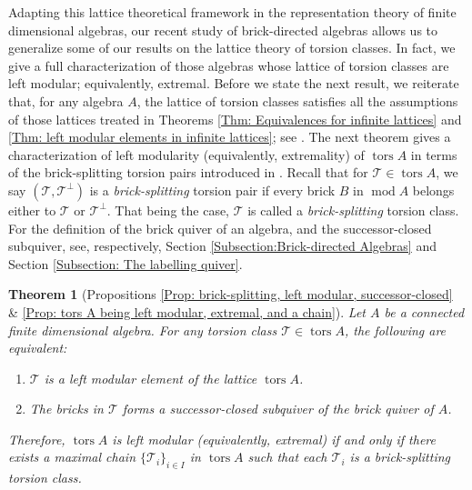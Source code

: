 \documentclass{amsart}
\theoremstyle{thmstyle}
\newtheorem{theorem}[thm]{Theorem}
\theoremstyle{exstyle}
\theoremstyle{defstyle}
\theoremstyle{remstyle}
\theoremstyle{remstyle}
\DeclareMathOperator*{\modu}{mod}
\DeclareMathOperator*{\brick}{brick}
\DeclareMathOperator*{\tors}{tors}
\DeclareMathOperator*{\Hasse}{Hasse}
\begin{document}
Adapting this lattice theoretical framework in the representation theory of finite dimensional algebras, our recent study of brick-directed algebras \cite{AI+} allows us to generalize some of our results on the lattice theory of torsion classes. In fact, we give a full characterization of those algebras whose lattice of torsion classes are left modular; equivalently, extremal. 
Before we state the next result, we reiterate that, for any algebra $A$, the lattice of torsion classes satisfies all the assumptions of those lattices treated in Theorems \ref{Thm: Equivalences for infinite lattices} and \ref{Thm: left modular elements in infinite lattices}; see \cite{DI+, RST}. 
The next theorem gives a characterization of left modularity (equivalently, extremality) of $\tors A$ in terms of the brick-splitting torsion pairs introduced in \cite{AI+}. 
Recall that for $\mathcal{T} \in \tors A$, we say $(\mathcal{T}, \mathcal{T}^{\perp})$ is a \emph{brick-splitting} torsion pair if every brick $B$ in $\modu A$ belongs either to $\mathcal{T}$ or $\mathcal{T}^{\perp}$. That being the case, $\mathcal{T}$ is called a \emph{brick-splitting} torsion class. For the definition of the brick quiver of an algebra, and the successor-closed subquiver, see, respectively, Section \ref{Subsection:Brick-directed Algebras} and Section \ref{Subsection: The labelling quiver}.

\begin{theorem}[Propositions \ref{Prop: brick-splitting, left modular, successor-closed} \& \ref{Prop: tors A being left modular, extremal, and a chain}]\label{thm: characterization by brick-splitting}
Let $A$ be a connected finite dimensional algebra. 
For any torsion class $\mathcal{T} \in \tors A$, the following are equivalent:
\begin{enumerate}
    \item $\mathcal{T}$ is a left modular element of the lattice $\tors A$.
    \item {The bricks in $\mathcal{T}$ forms a successor-closed subquiver of the brick quiver of $A$.}
\end{enumerate}
Therefore, $\tors A$ is left modular (equivalently, extremal) if and only if there exists a maximal chain $\{\mathcal{T}_i\}_{i\in I}$ in $\tors A$ such that each $\mathcal{T}_i$ is a brick-splitting torsion class.
\end{theorem}
\end{document}
